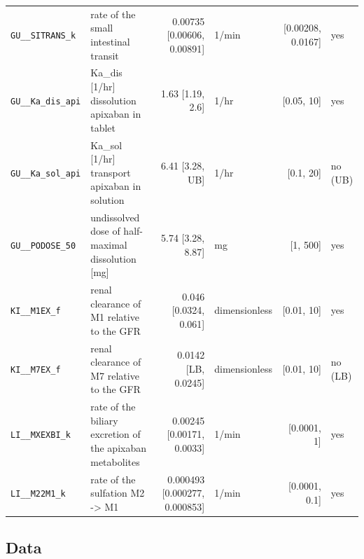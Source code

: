\documentclass{article}
\begin{document}
\begin{longtable}{llrlrl}
\texttt{GU\_\_SITRANS\_k} & rate of the small intestinal transit & 0.00735 [0.00606, 0.00891] & 1/min & [0.00208, 0.0167] & yes \\
\texttt{GU\_\_Ka\_dis\_api} & Ka\_dis [1/hr] dissolution apixaban in tablet & 1.63 [1.19, 2.6] & 1/hr & [0.05, 10] & yes \\
\texttt{GU\_\_Ka\_sol\_api} & Ka\_sol [1/hr] transport apixaban in solution & 6.41 [3.28, UB] & 1/hr & [0.1, 20] & no (UB) \\
\texttt{GU\_\_PODOSE\_50} & undissolved dose of half-maximal dissolution [mg] & 5.74 [3.28, 8.87] & mg & [1, 500] & yes \\
\texttt{KI\_\_M1EX\_f} & renal clearance of M1 relative to the GFR & 0.046 [0.0324, 0.061] & dimensionless & [0.01, 10] & yes \\
\texttt{KI\_\_M7EX\_f} & renal clearance of M7 relative to the GFR & 0.0142 [LB, 0.0245] & dimensionless & [0.01, 10] & no (LB) \\
\texttt{LI\_\_MXEXBI\_k} & rate of the biliary excretion of the apixaban metabolites & 0.00245 [0.00171, 0.0033] & 1/min & [0.0001, 1] & yes \\
\texttt{LI\_\_M22M1\_k} & rate of the sulfation M2 -> M1 & 0.000493 [0.000277, 0.000853] & 1/min & [0.0001, 0.1] & yes \\
\end{longtable}

\subsection{Data}
\end{document}
